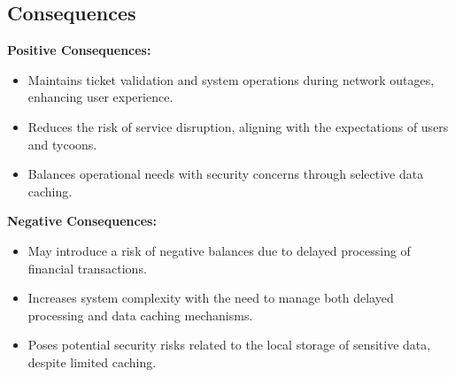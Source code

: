 \subsection*{Consequences}
\textbf{Positive Consequences:}
\begin{itemize}
    \item Maintains ticket validation and system operations during network outages, enhancing user experience.
    \item Reduces the risk of service disruption, aligning with the expectations of users and tycoons.
    \item Balances operational needs with security concerns through selective data caching.
\end{itemize}
\textbf{Negative Consequences:}
\begin{itemize}
    \item May introduce a risk of negative balances due to delayed processing of financial transactions.
    \item Increases system complexity with the need to manage both delayed processing and data caching mechanisms.
    \item Poses potential security risks related to the local storage of sensitive data, despite limited caching.
\end{itemize}
